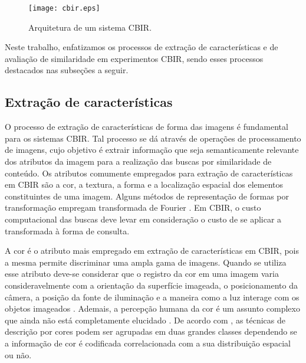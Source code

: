 \begin{figure} 
\centering
\caption{\label{fig:cbir} Arquitetura de um sistema \ac{CBIR}.}
\texttt{[image: cbir.eps]}
\end{figure}
 
Neste trabalho, enfatizamos os processos de extração de características e de avaliação de similaridade em experimentos \ac{CBIR}, sendo esses processos destacados nas subseções a seguir.

\subsection{Extração de características}

O processo de extração de características de forma das imagens é fundamental para os sistemas \ac{CBIR}. Tal processo se dá através de operações de processamento de imagens, cujo objetivo é extrair informação que seja semanticamente relevante dos atributos da imagem para a realização das buscas por similaridade de conteúdo. Os atributos comumente empregados para extração de características em \ac{CBIR} são a cor, a textura, a forma e a localização espacial dos elementos constituintes de uma imagem. Alguns métodos de representação de formas por transformação empregam transformada de Fourier \cite{Costa:1997,ShuPanWu2015}. Em \ac{CBIR}, o custo computacional das buscas deve levar em consideração o custo de se aplicar a transformada à forma de consulta. 

A cor é o atributo mais empregado em extração de características em \ac{CBIR}, pois a mesma permite discriminar uma ampla gama de imagens. Quando se utiliza esse atributo deve-se considerar que o registro da cor em uma imagem varia consideravelmente com a orientação da superfície imageada, o posicionamento da câmera, a posição da fonte de iluminação e a maneira como a luz interage com os objetos imageados \cite{Smeulders:2000}. Ademais, a percepção humana da cor é um assunto complexo que ainda não está completamente elucidado \cite{Smeulders:2000}. De acordo com , as técnicas de descrição por cores podem ser agrupadas em duas grandes classes dependendo se a informação de cor é codificada correlacionada com a sua distribuição espacial ou não. 

\begin{comment}Esses mesmos autores exemplificam como técnicas que não levam em consideração a distribuição espacial das cores os histogramas e os momentos de cores. 
\end{comment}

